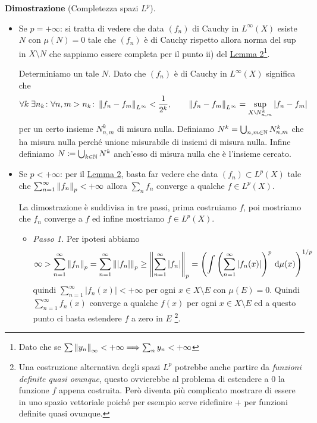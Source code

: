 \textbf{Dimostrazione} (Completezza spazi $L^p$).
\begin{itemize}

	\item Se $p = +\infty$: si tratta di vedere che data $(f_n)$ di Cauchy in $L^\infty(X)$ esiste $N$ con $\mu(N) = 0$ tale che $(f_n)$ è di Cauchy rispetto allora norma del sup in $X \setminus N$ che sappiamo essere completa per il punto ii) del \hyperlink{prop:completeness_lemma_2}{Lemma 2}\footnote{Dato che se $\sum \left\lVert y_n \right\rVert_\infty < +\infty \Longrightarrow \sum_n y_n < +\infty$}.

	Determiniamo un tale $N$. Dato che $(f_n)$ è di Cauchy in $L^\infty(X)$ significa che
	$$
		\forall k \; \exists n_k \colon \forall n,m > n_k \colon \norm{f_n - f_m}_{L^\infty} < \frac{1}{2^k}, \qquad \norm{f_n - f_m}_{L^\infty} = \sup_{X \setminus N_{n,m}^k} |f_n - f_m|
	$$
	per un certo insieme $N_{n,m}^k$ di misura nulla. Definiamo $N^k = \bigcup_{n,m \in \mathbb N} N_{n,m}^k$ che ha misura nulla perché unione misurabile di insiemi di misura nulla.
	Infine definiamo $N \coloneqq \bigcup_{k \in \mathbb N} N^k$ anch'esso di misura nulla che è l'insieme cercato.


	\item Se $p < +\infty$: per il \hyperlink{prop:completeness_lemma_2}{Lemma 2}, basta far vedere che data $(f_n) \subset L^p(X)$ tale che $\sum_{n=1}^\infty \left\lVert f_n \right\rVert_p < +\infty$ allora $\sum_n f_n$ converge a qualche $f \in L^p(X)$.

	La dimostrazione è suddivisa in tre passi, prima costruiamo $f$, poi mostriamo che $f_n$ converge a $f$ ed infine mostriamo $f \in L^p(X)$.

	\begin{itemize}

		\item \textit{Passo 1.} Per ipotesi abbiamo
		$$
			\infty 
			> \sum_{n=1}^\infty \left\lVert f_n \right\rVert_p 
			= \sum_{n=1}^\infty \left\lVert |f_n| \right\rVert_p 
			\geq \left\lVert \sum_{n=1}^\infty |f_n| \right\rVert_p 
			= \left( \int \left( \sum_{n=1}^\infty |f_n(x)| \right)^p \,\mathrm{d} \mu(x) \right)^{1/p}
		$$
		quindi $\sum_{n=1}^\infty |f_n(x)| < +\infty$ per ogni $x \in X \setminus E$ con $\mu(E) = 0$. Quindi $\sum_{n=1}^\infty f_n(x)$ converge a qualche $f(x)$ per ogni $x \in X \setminus E$ ed a questo punto ci basta estendere $f$ a zero in $E$ \footnote{Una costruzione alternativa degli spazi $L^p$ potrebbe anche partire da \textit{funzioni definite quasi ovunque}, questo ovvierebbe al problema di estendere a $0$ la funzione $f$ appena costruita. Però diventa più complicato mostrare di essere in uno spazio vettoriale poiché per esempio serve ridefinire $+$ per funzioni definite quasi ovunque.}.


\end{itemize}
\end{itemize}
